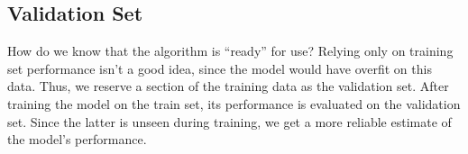 \documentclass[12pt]{article}
\begin{document}
\subsection{Validation Set}
How do we know that the algorithm is ``ready'' for use? Relying only on training set performance isn't a good idea, since the model would have overfit on this data. Thus, we reserve a section of the training data as the validation set. After training the model on the train set, its performance is evaluated on the validation set. Since the latter is unseen during training, we get a more reliable estimate of the model's performance.

%


\end{document}
